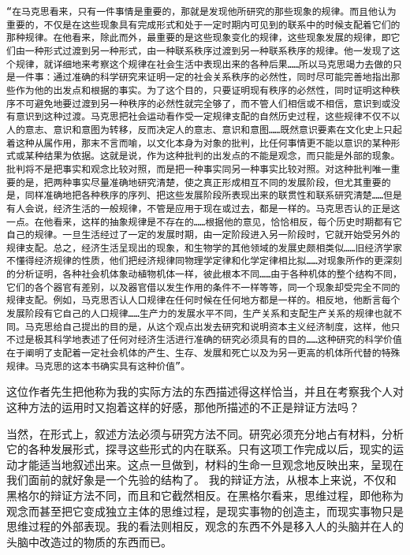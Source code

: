 \documentclass{ctexbook}
\begin{document}
\texttt{“在马克思看来，只有一件事情是重要的，那就是发现他所研究的那些现象的规律。而且他认为重要的，不仅是在这些现象具有完成形式和处于一定时期内可见到的联系中的时候支配着它们的那种规律。在他看来，除此而外，最重要的是这些现象变化的规律，这些现象发展的规律，即它们由一种形式过渡到另一种形式，由一种联系秩序过渡到另一种联系秩序的规律。他一发现了这个规律，就详细地来考察这个规律在社会生活中表现出来的各种后果……所以马克思竭力去做的只是一件事：通过准确的科学研究来证明一定的社会关系秩序的必然性，同时尽可能完善地指出那些作为他的出发点和根据的事实。为了这个目的，只要证明现有秩序的必然性，同时证明这种秩序不可避免地要过渡到另一种秩序的必然性就完全够了，而不管人们相信或不相信，意识到或没有意识到这种过渡。马克思把社会运动看作受一定规律支配的自然历史过程，这些规律不仅不以人的意志、意识和意图为转移，反而决定人的意志、意识和意图……既然意识要素在文化史上只起着这种从属作用，那末不言而喻，以文化本身为对象的批判，比任何事情更不能以意识的某种形式或某种结果为依据。这就是说，作为这种批判的出发点的不能是观念，而只能是外部的现象。批判将不是把事实和观念比较对照，而是把一种事实同另一种事实比较对照。对这种批判唯一重要的是，把两种事实尽量准确地研究清楚，使之真正形成相互不同的发展阶段，但尤其重要的是，同样准确地把各种秩序的序列、把这些发展阶段所表现出来的联贯性和联系研究清楚……但是有人会说，经济生活的一般规律，不管是应用于现在或过去，都是一样的。马克思否认的正是这一点。在他看来，这样的抽象规律是不存在的……根据他的意见，恰恰相反，每个历史时期都有它自己的规律。一旦生活经过了一定的发展时期，由一定阶段进入另一阶段时，它就开始受另外的规律支配。总之，经济生活呈现出的现象，和生物学的其他领域的发展史颇相类似……旧经济学家不懂得经济规律的性质，他们把经济规律同物理学定律和化学定律相比拟……对现象所作的更深刻的分析证明，各种社会机体象动植物机体一样，彼此根本不同……由于各种机体的整个结构不同，它们的各个器官有差别，以及器官借以发生作用的条件不一样等等，同一个现象却受完全不同的规律支配。例如，马克思否认人口规律在任何时候在任何地方都是一样的。相反地，他断言每个发展阶段有它自己的人口规律……生产力的发展水平不同，生产关系和支配生产关系的规律也就不同。马克思给自己提出的目的是，从这个观点出发去研究和说明资本主义经济制度，这样，他只不过是极其科学地表述了任何对经济生活进行准确的研究必须具有的目的……这种研究的科学价值在于阐明了支配着一定社会机体的产生、生存、发展和死亡以及为另一更高的机体所代替的特殊规律。马克思的这本书确实具有这种价值”。}

这位作者先生把他称为我的实际方法的东西描述得这样恰当，并且在考察我个人对这种方法的运用时又抱着这样的好感，那他所描述的不正是辩证方法吗？

当然，在形式上，叙述方法必须与研究方法不同。研究必须充分地占有材料，分析它的各种发展形式，探寻这些形式的内在联系。只有这项工作完成以后，现实的运动才能适当地叙述出来。这点一旦做到，材料的生命一旦观念地反映出来，呈现在我们面前的就好象是一个先验的结构了。
我的辩证方法，从根本上来说，不仅和黑格尔的辩证方法不同，而且和它截然相反。在黑格尔看来，思维过程，即他称为观念而甚至把它变成独立主体的思维过程，是现实事物的创造主，而现实事物只是思维过程的外部表现。我的看法则相反，观念的东西不外是移入人的头脑并在人的头脑中改造过的物质的东西而已。
\end{document}
